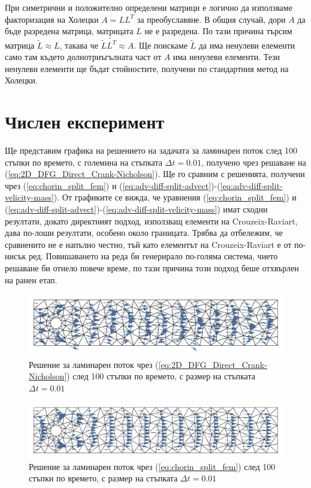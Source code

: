 \documentclass[12pt]{report}
\begin{document}
При симетрични и положително определени матрици е логично да използваме факторизация на Холецки $A=LL^T$ за преобуславяне. В общия случай, дори $A$ да бъде разредена матрица, матрицата $L$ не е разредена. По тази причина търсим матрица $\tilde{L} \approx L$, такава че $\tilde{L}\tilde{L^T} \approx A$. Ще поискаме $\tilde{L}$ да има ненулеви елементи само там където долнотриъгълната част от $A$ има ненулеви елементи. Тези ненулеви елементи ще бъдат стойностите, получени по стандартния метод на Холецки.

\section{Числен експеримент}
Ще представим графика на решението на задачата за ламинарен поток след 100 стъпки по времето, с големина на стъпката $\Delta t = 0.01$, получено чрез решаване на (\ref{eq:2D_DFG_Direct_Crank-Nicholson}). Ще го сравним с решенията, получени чрез (\ref{eq:chorin_split_fem}) и (\ref{eq:adv-diff-split-advect})-(\ref{eq:adv-diff-split-velicity-mass}).  От графиките се вижда, че уравнения (\ref{eq:chorin_split_fem}) и (\ref{eq:adv-diff-split-advect})-(\ref{eq:adv-diff-split-velicity-mass}) имат сходни резултати, докато директният подход, използващ елементи на Crouzeix-Raviart, дава по-лоши резултати, особено около границата. Трябва да отбележим, че сравненито не е напълно честно, тъй като елементът на Crouzeix-Raviart е от по-нисък ред. Повишаването на реда би генерирало по-голяма система, чието решаване би отнело повече време, по тази причина този подход беше отхвърлен на ранен етап.

\begin{figure}[H]
\centering
\includegraphics[width=\textwidth]{Figures/01_introduction/P1P0_100.pdf}
\caption{Решение за ламинарен поток чрез (\ref{eq:2D_DFG_Direct_Crank-Nicholson}) след 100 стъпки по времето, с размер на стъпката $\Delta t = 0.01$ }\label{fig:p0p1-plot}
\end{figure}

\begin{figure}[H]
\centering
\includegraphics[width=\textwidth]{Figures/01_introduction/P2P1_100.pdf}
\caption{Решение за ламинарен поток чрез (\ref{eq:chorin_split_fem}) след 100 стъпки по времето, с размер на стъпката $\Delta t = 0.01$ }\label{fig:chorin-plot}
\end{figure}
\end{document}
